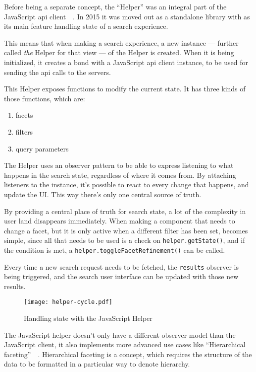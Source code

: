 Before being a separate concept, the ``Helper'' was an integral part of the JavaScript \acrshort{api} client~\cite{algolia-blog-js-client}~. In 2015 it was moved out as a standalone \gls{library} with as its main feature handling state of a search experience.

This means that when making a search experience, a new instance --- further called \emph{the} Helper for that view --- of the Helper is created. When it is being initialized, it creates a bond with a JavaScript \acrshort{api} client instance, to be used for sending the \acrshort{api} calls to the servers.

This Helper exposes functions to modify the current state. It has three kinds of those functions, which are:

\begin{enumerate}
  \item facets
  \item filters
  \item query parameters
\end{enumerate}

The Helper uses an observer pattern to be able to express listening to what happens in the search state, regardless of where it comes from. By attaching listeners to the instance, it's possible to react to every change that happens, and update the UI. This way there's only one central source of truth.

By providing a central place of truth for search state, a lot of the complexity in user land disappears immediately. When making a component that needs to change a facet, but it is only active when a different filter has been set, becomes simple, since all that needs to be used is a check on {\tt helper.getState()}, and if the condition is met, a {\tt helper.toggleFacetRefinement()} can be called.

Every time a new search request needs to be fetched, the {\tt results} observer is being triggered, and the search user interface can be updated with those new results.

\begin{figure}[H]
  \centering
  \texttt{[image: helper-cycle.pdf]}
  \caption{Handling state with the JavaScript Helper\cite{js-helper-concepts}}
  \label{figure:js-helper-state}
\end{figure}

The JavaScript helper doesn't only have a different observer model than the JavaScript client, it also implements more advanced use cases like ``Hierarchical faceting''~\cite{hierarchical-faceting}~. Hierarchical faceting is a concept, which requires the structure of the data to be formatted in a particular way to denote hierarchy. 

